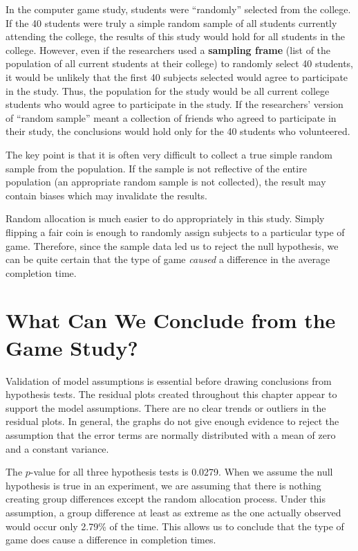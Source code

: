 \documentclass[
]{report}
\begin{document}
In the computer game study, students were ``randomly'' selected from the college. If the 40 students were truly a simple random sample of all students currently attending the college, the results of this study would hold for all students in the college. However, even if the researchers used a \textbf{sampling frame} (list of the population of all current students at their college) to randomly select 40 students, it would be unlikely that the first 40 subjects selected would agree to participate in the study. Thus, the population for the study would be all current college students who would agree to participate in the study. If the researchers' version of ``random sample'' meant a collection of friends who agreed to participate in their study, the conclusions would hold only for the 40 students who volunteered.

The key point is that it is often very difficult to collect a true simple random sample from the population. If the sample is not reflective of the entire population (an appropriate random sample is not collected), the result may contain biases which may invalidate the results.

Random allocation is much easier to do appropriately in this study. Simply flipping a fair coin is enough to randomly assign subjects to a particular type of game. Therefore, since the sample data led us to reject the null hypothesis, we can be quite certain that the type of game \emph{caused} a difference in the average completion time.

\section{\texorpdfstring{\textbf{What Can We Conclude from the Game Study?}}{What Can We Conclude from the Game Study?}}\label{what-can-we-conclude-from-the-game-study}

Validation of model assumptions is essential before drawing conclusions from hypothesis tests. The residual plots created throughout this chapter appear to support the model assumptions. There are no clear trends or outliers in the residual plots. In general, the graphs do not give enough evidence to reject the assumption that the error terms are normally distributed with a mean of zero and a constant variance.

The \(p\)-value for all three hypothesis tests is 0.0279. When we assume the null hypothesis is true in an experiment, we are assuming that there is nothing creating group differences except the random allocation process. Under this assumption, a group difference at least as extreme as the one actually observed would occur only 2.79\% of the time. This allows us to conclude that the type of game does cause a difference in completion times.
\end{document}
